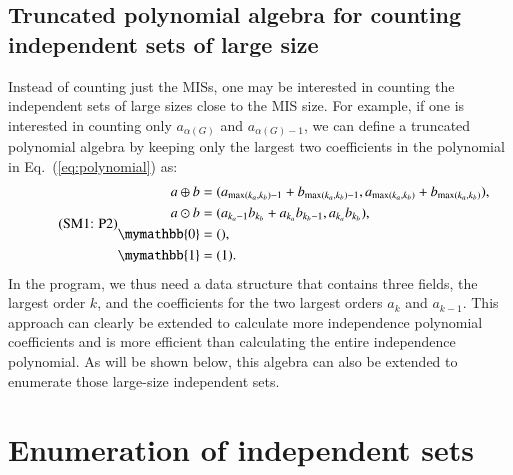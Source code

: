 \documentclass[onefignum, onetabnum]{siamart190516}
\newcommand{\eqname}[1]{\stepcounter{equation}\tag{\theequation : #1}}
\newcommand{\<}{\langle}
\renewcommand{\>}{\rangle}
\newcommand{\Eq}[1]{Eq.~(\ref{#1})}
\newcounter{example}
\begin{document}
\subsection{Truncated polynomial algebra for counting independent sets of large size}
Instead of counting just the MISs, one may be interested in counting the independent sets of large sizes close to the MIS size.
For example, if one is interested in counting only $a_{\alpha(G)}$ and $a_{\alpha(G)-1}$, we can define a truncated polynomial algebra by keeping only the largest two coefficients in the polynomial in \Eq{eq:polynomial} as:
\begin{equation}
    \eqname{P2}
    \begin{split}
    a \oplus b &= (a_{\max(k_a, k_b)-1} + b_{\max(k_a, k_b)-1}, a_{\max(k_a, k_b)} + b_{\max(k_a, k_b)}),\\
    a \odot b &= (a_{k_a-1} b_{k_b}+a_{k_a} b_{k_b-1}, a_{k_a} b_{k_b}),\\
    \mymathbb{0} &= (), \\
    \mymathbb{1} &= (1).\label{eq:max2poly}
    \end{split}
\end{equation}
In the program, we thus need a data structure that contains three fields, the largest order $k$, and the coefficients for the two largest orders $a_k$ and $a_{k-1}$.
This approach can clearly be extended to calculate more independence polynomial coefficients and is more efficient than calculating the entire independence polynomial.
As will be shown below, this algebra can also be extended to enumerate those large-size independent sets.

\section{Enumeration of independent sets}
\end{document}
